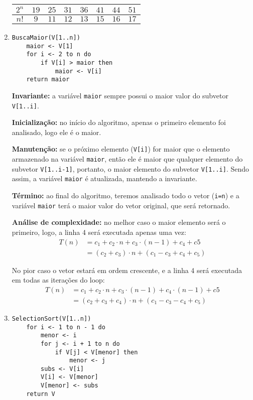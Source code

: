 \documentclass{article}
\begin{document}
\begin{enumerate}
\begin{tabular} {|c|c|c|c|c|c|c|c|}
	$2^n$ & $19$ & $25$ & $31$ & $36$ & $41$ & $44$ & $51$ \\ \hline

	$n!$ & $9$ & $11$ & $12$ & $13$ & $15$ & $16$ & $17$ \\ \hline

	\end{tabular}

	\item \begin{lstlisting}[frame=single, tabsize=4]
BuscaMaior(V[1..n])
	maior <- V[1]
	for i <- 2 to n do
		if V[i] > maior then
			maior <- V[i]
	return maior
	\end{lstlisting}

	\textbf{Invariante:} a variável \texttt{maior} sempre possui o maior valor
	do subvetor \texttt{V[1..i]}.

	\textbf{Inicialização:} no início do algoritmo, apenas o primeiro elemento
	foi analisado, logo ele é o maior.

	\textbf{Manutenção:} se o próximo elemento (\texttt{V[i]}) for maior que o
	elemento armazenado na variável \texttt{maior}, então ele é maior que
	qualquer elemento do subvetor \texttt{V[1..i-1]}, portanto, o maior
	elemento do subvetor \texttt{V[1..i]}. Sendo assim, a variável
	\texttt{maior} é atualizada, mantendo a invariante.

	\textbf{Término:} ao final do algoritmo, teremos analisado todo o vetor
	(\texttt{i=n}) e a variável \texttt{maior} terá o maior valor do vetor
	original, que será retornado.

	\textbf{Análise de complexidade:} no melhor caso o maior elemento será o
	primeiro, logo, a linha 4 será executada apenas uma vez:
	\begin{align*}
	T(n) &= c_1 + c_2\cdot n + c_3\cdot (n-1) + c_4 + c5 \\
	&= (c_2 + c_3)\cdot n + (c_1 - c_3 + c_4 + c_5)
	\end{align*}

	No pior caso o vetor estará em ordem crescente, e a linha 4 será executada
	em todas as iterações do loop:
	\begin{align*}
	T(n) &= c_1 + c_2\cdot n + c_3\cdot (n-1) + c_4\cdot (n-1) + c5 \\
	&= (c_2 + c_3 + c_4)\cdot n + (c_1 - c_3 - c_4 + c_5)
	\end{align*}

	\item \begin{lstlisting}[frame=single, tabsize=4]
SelectionSort(V[1..n])
	for i <- 1 to n - 1 do
		menor <- i
		for j <- i + 1 to n do
			if V[j] < V[menor] then
				menor <- j
		subs <- V[i]
		V[i] <- V[menor]
		V[menor] <- subs
	return V
	\end{lstlisting}


\end{enumerate}
\end{document}
